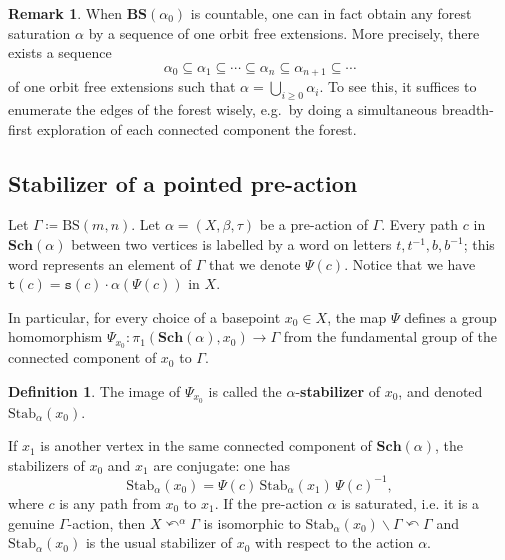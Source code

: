 \documentclass[12pt]{article}
\numberwithin{equation}{section}
\theoremstyle{definition}
\newtheorem{definition}[equation]{Definition}
\newtheorem{remark}[equation]{Remark}
\def\defin#1{\textbf{#1}}
\newcommand{\inv}{^{-1}}
\newcommand\BSo{\mathrm{BS}}
\newcommand\BSe{\mathbf{BS}}
\newcommand{\Stab}{\mathrm{Stab}}
\newcommand{\Sch}{\mathbf{Sch}}
\newcommand\Schreier{\Sch}
\newcommand{\source}{\mathtt{s}}
\newcommand{\target}{\mathtt{t}}
\newcommand{\bs}{\backslash}
\begin{document}
	\begin{remark}
		\label{rem: saturation by sequence of one orbit extensions}
		When $\BSe(\alpha_0)$ is countable, one can in fact obtain any forest saturation \( \alpha \)
	 	by a sequence of one orbit free extensions.
		More precisely, there exists a sequence
		\[
			\alpha_0 \subseteq \alpha_1 \subseteq \cdots \subseteq \alpha_n \subseteq \alpha_{n+1} \subseteq \cdots
		\]
		of one orbit free extensions such that $\alpha = \bigcup_{i\geq 0} \alpha_i$.
		To see this, it suffices to enumerate the edges of the forest wisely,
		e.g.~by doing a simultaneous breadth-first exploration of each 
		connected component the forest. 
	\end{remark}


\subsection{Stabilizer of a pointed pre-action}\label{subsect: stab of pre-action}


	Let $\Gamma \coloneqq \BSo(m,n)$.
	Let $\alpha=(X, \beta, \tau)$ be a pre-action of \( \Gamma \).
	Every path \( c \) in $\Sch(\alpha)$ between two vertices is labelled by a word on letters $t, t\inv, b, b\inv$;
	this word represents an element of \( \Gamma \) that we denote $\Psi(c)$.
	Notice that we have $\target(c) = \source(c)\cdot \alpha(\Psi(c))$ in \( X \).

	In particular, for every choice of a basepoint $x_0\in X$, the map $\Psi$ defines a group homomorphism $\Psi_{x_0}:\pi_1(\Sch(\alpha), x_0)\to \Gamma$ from the fundamental group of the connected component of \( x_0 \) to \( \Gamma \).
	\begin{definition}
		\label{stabilizer of pre-action}
		The image of $\Psi_{x_0}$ is called the \( \alpha \)-\defin{stabilizer} of \( x_0 \), and denoted $\Stab_\alpha(x_0)$.
	\end{definition}
	If $x_1$ is another vertex in the same connected component of $\Schreier(\alpha)$, the stabilizers of \( x_0 \) and $x_1$ are conjugate:
	one has
	\[
		\Stab_\alpha(x_0) = \Psi(c) \, \Stab_\alpha(x_1) \, \Psi(c)\inv ,
	\]
	where \( c \) is any path from \( x_0 \) to $x_1$.
	If the pre-action \( \alpha \) is saturated, i.e. it is a genuine \( \Gamma \)-action, 
	then $X\curvearrowleft^\alpha \Gamma$ is isomorphic to $\Stab_\alpha(x_0)\bs \Gamma \curvearrowleft \Gamma$
	and $\Stab_\alpha(x_0)$ is the usual stabilizer of \( x_0 \) with respect to the action \( \alpha \).
\end{document}
